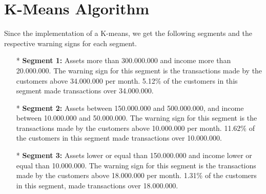 \section{K-Means Algorithm}
Since the implementation of a K-means, we get the following segments and the respective warning signs for each segment.
\begin{itemize}
\item[*] \textbf{Segment 1:}
Assets more than 300.000.000 and income more than 20.000.000.
The warning sign for this segment is the transactions made by the customers above 34.000.000 per month. 5.12\% of the customers in this segment made transactions over 34.000.000.
\item[*] \textbf{Segment 2:}
Assets between 150.000.000 and 500.000.000, and income between 10.000.000 and 50.000.000.
The warning sign for this segment is the transactions made by the customers above 10.000.000 per month. 11.62\% of the customers in this segment made transactions over 10.000.000.
\item[*] \textbf{Segment 3:}
Assets lower or equal than 150.000.000 and income lower or equal than 10.000.000.
The warning sign for this segment is the transactions made by the customers above 18.000.000 per month. 1.31\% of the customers in this segment, made transactions over 18.000.000.
\end{itemize}
%
